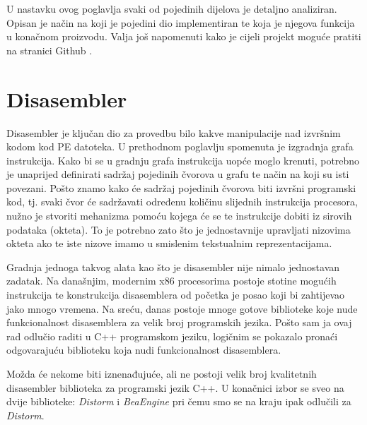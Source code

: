 \documentclass[times, utf8, diplomski, numeric]{fer}
\begin{document}
U nastavku ovog poglavlja svaki od pojedinih dijelova je detaljno
analiziran. Opisan je način na koji je pojedini dio implementiran
te koja je njegova funkcija u konačnom proizvodu. Valja još
napomenuti kako je cijeli projekt moguće pratiti na stranici
Github \citep{bh_permutator}.					%


\section{Disasembler}

Disasembler je ključan dio za provedbu bilo kakve manipulacije
nad izvršnim kodom kod PE datoteka. U prethodnom poglavlju
spomenuta je izgradnja grafa instrukcija. Kako bi se u gradnju
grafa instrukcija uopće moglo krenuti, potrebno je unaprijed
definirati sadržaj pojedinih čvorova u grafu te način na koji su
isti povezani. Pošto znamo kako će sadržaj pojedinih čvorova biti
izvršni programski kod, tj. svaki čvor će sadržavati određenu
količinu slijednih instrukcija procesora, nužno je stvoriti
mehanizma pomoću kojega će se te instrukcije dobiti iz sirovih
podataka (okteta). To je potrebno zato što je jednostavnije
upravljati nizovima okteta ako te iste nizove imamo u
smislenim tekstualnim reprezentacijama.

Gradnja jednoga takvog alata kao što je disasembler nije nimalo
jednostavan zadatak. Na današnjim, modernim x86 procesorima
postoje stotine mogućih instrukcija te konstrukcija disasemblera
od početka je posao koji bi zahtijevao jako mnogo vremena. Na
sreću, danas postoje mnoge gotove biblioteke koje nude
funkcionalnost disasemblera za velik broj programskih jezika.
Pošto sam ja ovaj rad odlučio raditi u C++ programskom jeziku,
logičnim se pokazalo pronaći odgovarajuću biblioteku koja nudi
funkcionalnost disasemblera.

Možda će nekome biti iznenađujuće, ali ne postoji velik broj
kvalitetnih disasembler biblioteka za programski jezik C++. U
konačnici izbor se sveo na dvije biblioteke:					%
\emph{Distorm} \citep{distorm} i
\emph{BeaEngine} \citep{bea_engine} pri čemu smo se na kraju ipak 
odlučili za		%
\emph{Distorm}.
\end{document}
